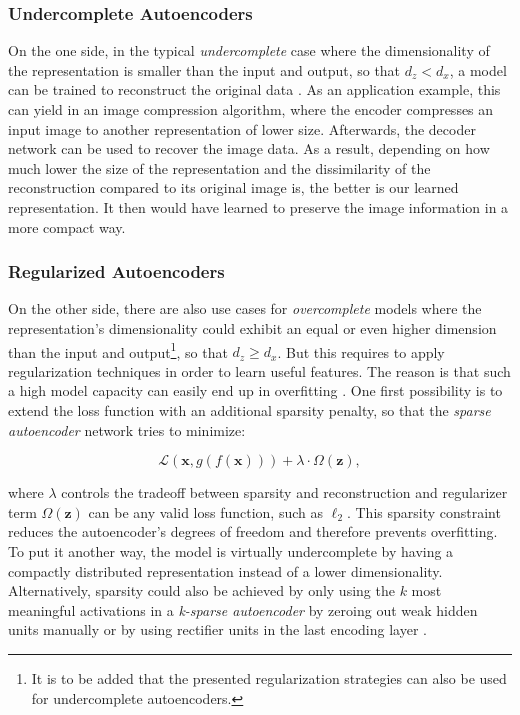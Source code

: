 \subsubsection*{Undercomplete Autoencoders}

On the one side, in the typical \textit{undercomplete} case where the dimensionality of the representation is smaller than the input and output, so that $ d_z < d_x $, a model can be trained to reconstruct the original data \parencite[p. 503]{deep_learning}. As an application example, this can yield in an image compression algorithm, where the encoder compresses an input image to another representation of lower size. Afterwards, the decoder network can be used to recover the image data. As a result, depending on how much lower the size of the representation and the dissimilarity of the reconstruction compared to its original image is, the better is our learned representation. It then would have learned to preserve the image information in a more compact way.

\subsubsection*{Regularized Autoencoders}

On the other side, there are also use cases for \textit{overcomplete} models where the representation's dimensionality could exhibit an equal or even higher dimension than the input and output\footnote{It is to be added that the presented regularization strategies can also be used for undercomplete autoencoders.}, so that $ d_z \geq d_x $. But this requires to apply regularization techniques in order to learn useful features. The reason is that such a high model capacity can easily end up in overfitting \parencite[p. 504f.]{deep_learning}. One first possibility is to extend the loss function with an additional sparsity penalty, so that the \textit{sparse autoencoder} network tries to minimize:

\begin{equation} \label{eq:autoenc-sparse}
	\mathcal{L}(\textbf{x}, g(f(\textbf{x}))) + \lambda \cdot \Omega(\textbf{z}) ,
\end{equation}

where $ \lambda $ controls the tradeoff between sparsity and reconstruction and regularizer term $ \Omega(\textbf{z}) $ can be any valid loss function, such as $ \ell_2 $. This sparsity constraint reduces the autoencoder's degrees of freedom and therefore prevents overfitting. To put it another way, the model is virtually undercomplete by having a compactly distributed representation instead of a lower dimensionality. Alternatively, sparsity could also be achieved by only using the $ k $ most meaningful activations in a \textit{k-sparse autoencoder} by zeroing out weak hidden units manually \parencite{k-sparse-autoenc} or by using rectifier units in the last encoding layer \parencite{rect-autoenc}.

